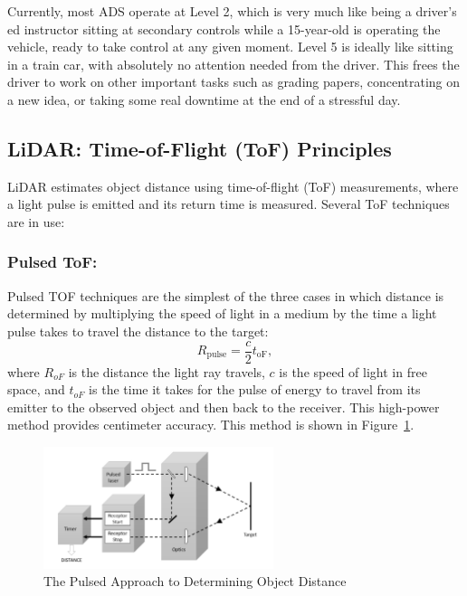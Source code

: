 \documentclass[12pt]{article}
\begin{document}
Currently, most ADS operate at Level 2, which is very much like being a
driver's ed instructor sitting at secondary controls while a 15-year-old is
operating the vehicle, ready to take control at any given moment. Level 5 is
ideally like sitting in a train car, with
absolutely no attention needed from the driver. This frees the driver to work on
other important tasks such as grading papers, concentrating on a new idea, or
taking some real downtime at the end of a stressful day.

\subsection{LiDAR: Time-of-Flight (ToF) Principles}

LiDAR estimates object distance using time-of-flight (ToF) measurements, where a light pulse is emitted and its return time is measured. Several ToF techniques are in use:

\subsubsection{Pulsed ToF:}
Pulsed TOF techniques are the simplest of the three cases in which distance is
determined by multiplying the speed of light in a medium by the time a light
pulse takes to travel the distance to the target:
\begin{equation}
R_{\text{pulse}} = \frac{c}{2} t_{\text{oF}},
\label{eq:tof_pulse}
\end{equation}
where $R_{oF}$ is the distance the light ray travels, $c$ is the speed of
light in free space, and $t_{oF}$ is the time it takes for the pulse of energy
to travel from its emitter to the observed object and then back to the receiver.
This high-power method provides centimeter accuracy. This method is shown in
Figure~\ref{fig:pulse}.
\begin{figure}[H]
	\centering
	\includegraphics[width=0.6\textwidth]{lidar.png}
	\caption{The Pulsed Approach to Determining Object Distance \cite{2019Royo}}
	\label{fig:pulse}
\end{figure}
\end{document}
